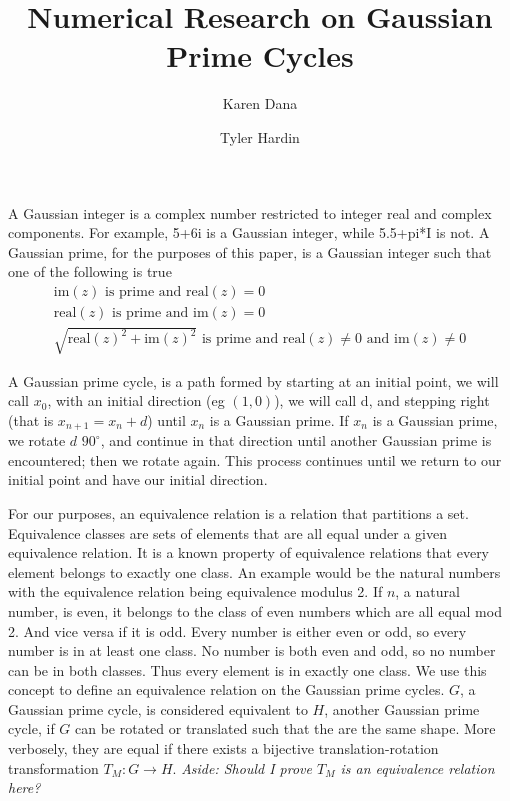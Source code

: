 \documentclass{article}
\title{Numerical Research on Gaussian Prime Cycles}
\author{Karen Dana \and Tyler Hardin}
\begin{document}
	\maketitle
	
A Gaussian integer is a complex number restricted to integer real and complex components. For example, 5+6i is a Gaussian integer, while 5.5+pi*I is not. A Gaussian prime, for the purposes of this paper, is a Gaussian integer such that one of the following is true
\begin{gather*}
  \mbox{im}(z) \mbox{ is prime and } \mbox{real}(z) = 0 \\
  \mbox{real}(z) \mbox{ is prime and } \mbox{im}(z) = 0 \\
  \sqrt{\mbox{real}(z)^2 + \mbox{im}(z)^2} \mbox{ is prime and } \mbox{real}(z) \neq 0 \mbox{ and } \mbox{im}(z) \neq 0
\end{gather*}
  
A Gaussian prime cycle, is a path formed by starting at an initial point, we will call $x_0$, with an initial direction (eg $(1,0)$), we will call d, and stepping right (that is $x_{n+1}=x_n + d$) until $x_n$ is a Gaussian prime. If $x_n$ is a Gaussian prime, we rotate $d$ $90^{\circ}$, and continue in that direction until another Gaussian prime is encountered; then we rotate again. This process continues until we return to our initial point and have our initial direction.

For our purposes, an equivalence relation is a relation that partitions a set. 
Equivalence classes are sets of elements that are all equal under a given equivalence relation. It is a known property of equivalence relations that every element belongs to exactly one class.
An example would be the natural numbers with the equivalence relation being equivalence modulus 2.
If $n$, a natural number, is even, it belongs to the class of even numbers which are all equal mod 2.
And vice versa if it is odd. Every number is either even or odd, so every number is in at least one class. No number is both even and odd, so no number can be in both classes. Thus every element is in exactly one class.
We use this concept to define an equivalence relation on the Gaussian prime cycles.
$G$, a Gaussian prime cycle, is considered equivalent to $H$, another Gaussian prime cycle, if $G$ can be rotated or translated such that the are the same shape.
More verbosely, they are equal if there exists a bijective translation-rotation transformation $T_M:G \to H$. \textit{Aside: Should I prove $T_M$ is an equivalence relation here?}
\end{document}
